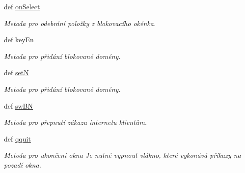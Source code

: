 \begin{DoxyCompactItemize}
def \hyperlink{classmnEnDis_1_1App_ad20f09e427dc61e92923f8d31328b354}{on\-Select}
\begin{DoxyCompactList}\small\item\em Metoda pro odebrání položky z blokovacího okénka. \end{DoxyCompactList}\item 
def \hyperlink{classmnEnDis_1_1App_adf3a656d9cbec9df505eb8fabb88627e}{key\-En}
\begin{DoxyCompactList}\small\item\em Metoda pro přidání blokované domény. \end{DoxyCompactList}\item 
def \hyperlink{classmnEnDis_1_1App_a23f27d69c398a8b23d2b49556dc29d1b}{set\-N}
\begin{DoxyCompactList}\small\item\em Metoda pro přidání blokované domény. \end{DoxyCompactList}\item 
def \hyperlink{classmnEnDis_1_1App_a0dec9c73d259d0826a1bf2fea42358db}{sw\-B\-N}
\begin{DoxyCompactList}\small\item\em Metoda pro přepnutí zákazu internetu klientům. \end{DoxyCompactList}\item 
def \hyperlink{classmnEnDis_1_1App_affc24d80e2923473251a5321f50e11fb}{qquit}
\begin{DoxyCompactList}\small\item\em Metoda pro ukončení okna Je nutné vypnout vlákno, které vykonává příkazy na pozadí okna. \end{DoxyCompactList}\end{DoxyCompactItemize}
